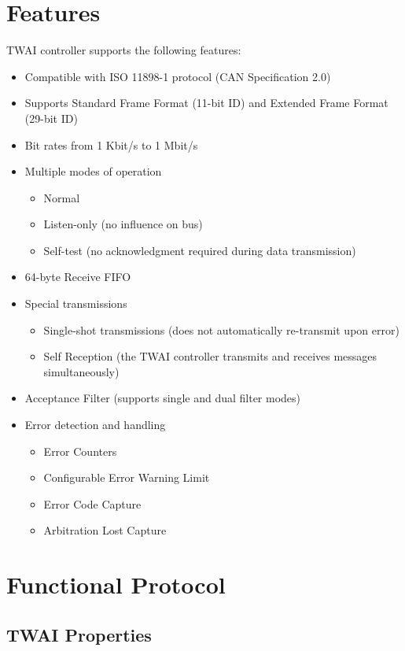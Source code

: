 \documentclass[main\_\_EN.tex]{subfiles}
\begin{document}
\section{Features}
\chipname{} TWAI controller supports the following features:
\begin{itemize}
    \item Compatible with ISO 11898-1 protocol (CAN Specification 2.0)
    \item Supports Standard Frame Format (11-bit ID) and Extended Frame Format (29-bit ID)
    \item Bit rates from 1 Kbit/s to 1 Mbit/s
    \item Multiple modes of operation
    \begin{itemize}
        \item Normal
        \item Listen-only (no influence on bus)
        \item Self-test (no acknowledgment required during data transmission)
    \end{itemize}
    \item 64-byte Receive FIFO
    \item Special transmissions
    \begin{itemize}
        \item Single-shot transmissions (does not automatically re-transmit upon error)
        \item Self Reception (the TWAI controller transmits and receives messages simultaneously)
    \end{itemize}
    \item Acceptance Filter (supports single and dual filter modes)
    \item Error detection and handling
    \begin{itemize}
        \item Error Counters
        \item Configurable Error Warning Limit
        \item Error Code Capture
        \item Arbitration Lost Capture
    \end{itemize}
\end{itemize}

\section{Functional Protocol}
\label{sec:twai-functional-protocol}

\subsection{TWAI Properties}
\end{document}
